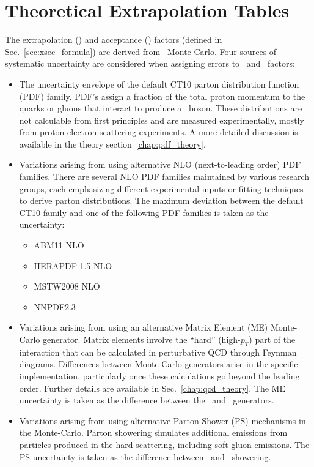 \section{Theoretical Extrapolation Tables}
\label{sec:mc:extraptables}
The extrapolation (\E) and acceptance (\A) factors (defined in Sec.~\ref{sec:xsec_formula}) are derived from \Wmn\ Monte-Carlo. Four sources of systematic uncertainty are considered when assigning errors to \E\ and \A\ factors:
\begin{itemize}
\item The uncertainty envelope of the default CT10 parton distribution function (PDF) family. PDF's assign a fraction of the total proton momentum to the quarks or gluons that interact to produce a \Wboson\ boson. These distributions are not calculable from first principles and are measured experimentally, mostly from proton-electron scattering experiments. A more detailed discussion is available in the theory section~\ref{chap:pdf_theory}.
\item Variations arising from using alternative NLO (next-to-leading order) PDF families. There are several NLO PDF families maintained by various research groups, each emphasizing different experimental inputs or fitting techniques to derive parton distributions. The maximum deviation between the default CT10 family and one of the following PDF families is taken as the uncertainty:
\begin{itemize}
\item ABM11 NLO~\cite{Alekhin:2012ig}
\item HERAPDF 1.5 NLO~\cite{Aaron:2009aa,Radescu:2011cn}
\item MSTW2008 NLO~\cite{Martin:2009iq}
\item NNPDF2.3~\cite{Ball:2012cx}
\end{itemize}
\item Variations arising from using an alternative Matrix Element (ME) Monte-Carlo generator. Matrix elements involve the ``hard'' (high-$p_{T}$) part of the interaction that can be calculated in perturbative QCD through Feynman diagrams. Differences between Monte-Carlo generators arise in the specific implementation, particularly once these calculations go beyond the leading order. Further details are available in Sec.~\ref{chap:qcd_theory}. The ME uncertainty is taken as the difference between the \Mcatnlo\ and \Powheg\ generators.
\item Variations arising from using alternative Parton Shower (PS) mechanisms in the Monte-Carlo. Parton showering simulates additional emissions from particles produced in the hard scattering, including soft gluon emissions. The PS uncertainty is taken as the difference between \Herwig\ and \Pythia\ showering.
\end{itemize}

